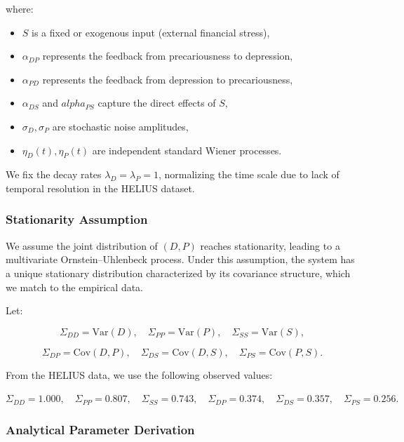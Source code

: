\documentclass[
]{article}
\providecommand{\tightlist}{%
  \setlength{\itemsep}{0pt}\setlength{\parskip}{0pt}}\usepackage{longtable,booktabs,array}
\begin{document}
where:

\begin{itemize}
\tightlist
\item
  \(S\) is a fixed or exogenous input (external financial stress),
\item
  \(\alpha_{DP}\) represents the feedback from precariousness to
  depression,
\item
  \(\alpha_{PD}\) represents the feedback from depression to
  precariousness,
\item
  \(\alpha_{DS}\) and \(alpha_{PS}\) capture the direct effects of
  \(S\),
\item
  \(\sigma_D, \sigma_P\) are stochastic noise amplitudes,
\item
  \(\eta_D(t), \eta_P(t)\) are independent standard Wiener processes.
\end{itemize}

We fix the decay rates \(\lambda_D = \lambda_P = 1\), normalizing the
time scale due to lack of temporal resolution in the HELIUS dataset.

\subsubsection{Stationarity Assumption}\label{stationarity-assumption}

We assume the joint distribution of \((D, P)\) reaches stationarity,
leading to a multivariate Ornstein--Uhlenbeck process. Under this
assumption, the system has a unique stationary distribution
characterized by its covariance structure, which we match to the
empirical data.

Let:

\[
\Sigma_{DD} = \mathrm{Var}(D), \quad \Sigma_{PP} = \mathrm{Var}(P), \quad \Sigma_{SS} = \mathrm{Var}(S),
\]

\[
\Sigma_{DP} = \mathrm{Cov}(D, P), \quad \Sigma_{DS} = \mathrm{Cov}(D, S), \quad \Sigma_{PS} = \mathrm{Cov}(P, S).
\]

From the HELIUS data, we use the following observed values:

\(\Sigma_{DD} = 1.000, \quad \Sigma_{PP} = 0.807, \quad \Sigma_{SS} = 0.743, \quad \Sigma_{DP} = 0.374, \quad \Sigma_{DS} = 0.357, \quad \Sigma_{PS} = 0.256.\)

\subsubsection{Analytical Parameter
Derivation}\label{analytical-parameter-derivation}
\end{document}
